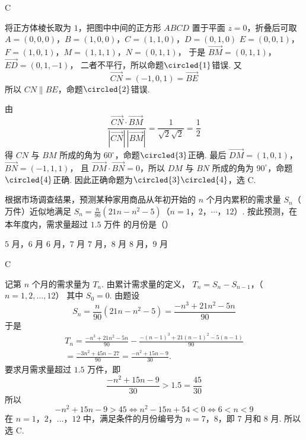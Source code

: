 \begin{answer}
C
\end{answer}

\begin{solution}
将正方体棱长取为 \(1\)，把图中中间的正方形 \(ABCD\) 置于平面 \(z=0\)，折叠后可取
\(A=(0,0,0)\)，\(B=(1,0,0)\)，\(C=(1,1,0)\)，\(D=(0,1,0)\)
\(E=(0,0,1)\)，\(F=(1,0,1)\)，\(M=(1,1,1)\)，\(N=(0,1,1)\)，
于是
\(\overrightarrow{BM}=(0,1,1)\)，\(\overrightarrow{ED}=(0,1,-1)\)，
二者不平行，所以命题\(\circled{1}\)错误. 又
\[
\overrightarrow{CN}=(-1,0,1)=\overrightarrow{BE}
\]
所以 \(CN\parallel BE\)，命题\(\circled{2}\)错误.

由
\[
\frac{\overrightarrow{CN}\cdot\overrightarrow{BM}}
{|\overrightarrow{CN}|\,|\overrightarrow{BM}|}
=\frac{1}{\sqrt2\sqrt2}=\frac12
\]
得 \(CN\) 与 \(BM\) 所成的角为 \(60^{\circ}\)，命题\(\circled{3}\)正确. 最后
\(\overrightarrow{DM}=(1,0,1)\)，\(\overrightarrow{BN}=(-1,1,1)\)，
且 \(\overrightarrow{DM}\cdot\overrightarrow{BN}=0\)，所以 \(DM\) 与 \(BN\) 所成的角为 \(90^{\circ}\)，命题\(\circled{4}\)正确. 因此正确命题为\(\circled{3}\circled{4}\)，选 C.
\end{solution}

\begin{problem}
根据市场调查结果，预测某种家用商品从年初开始的 \(n\) 个月内累积的需求量 \(S_{n}\)（\(\text{万件}\)）近似地满足 \(S_{n} = \frac{n}{90}(21n - n^{2} - 5)\)（\(n = 1\)，\(2\)，\(\cdots\)，\(12\)）. 按此预测，在本年度内，需求量超过 \(1.5\text{ 万件}\) 的月份是（\quad）

\choices
    {\(5\text{ 月}\)，\(6\text{ 月}\)}
    {\(6\text{ 月}\)，\(7\text{ 月}\)}
    {\(7\text{ 月}\)，\(8\text{ 月}\)}
    {\(8\text{ 月}\)，\(9\text{ 月}\)}
\end{problem}

\begin{answer}
C
\end{answer}

\begin{solution}
记第 \(n\) 个月的需求量为 \(T_n\). 由累计需求量的定义，
\(T_n=S_n-S_{n-1}\)，（\(n=1,2,\ldots,12\)）
其中 \(S_0=0\). 由题设
\[
S_n=\frac{n}{90}(21n-n^2-5)=\frac{-n^3+21n^2-5n}{90}
\]
于是
\[
\begin{gathered}
T_n
=\frac{-n^3+21n^2-5n}{90}
-\frac{-(n-1)^3+21(n-1)^2-5(n-1)}{90}\\
=\frac{-3n^2+45n-27}{90}
=\frac{-n^2+15n-9}{30}.
\end{gathered}
\]
要求月需求量超过 \(1.5\) 万件，即
\[
\frac{-n^2+15n-9}{30}>1.5=\frac{45}{30}
\]
所以
\[
-n^2+15n-9>45
\iff n^2-15n+54<0
\iff 6<n<9
\]
在 \(n=1\)，\(2\)，\(\ldots\)，\(12\) 中，满足条件的月份编号为 \(n=7\)，\(8\)，即 7 月和 8 月.
所以选 C.
\end{solution}

